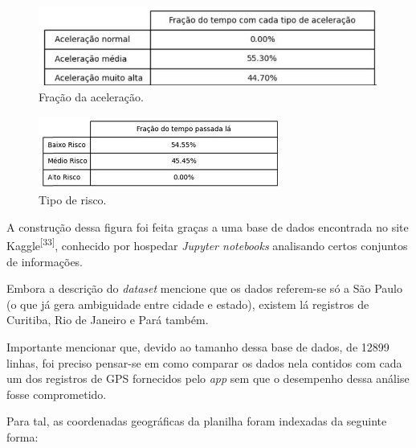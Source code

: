 \begin{figure}[hp]
    \centering
    
    \includegraphics[scale= 0.85]{figures/tabela_2.jpg}
    
    \caption{Fração da aceleração.}
    
    \label{fig:tab1}
\end{figure}

\begin{figure}[hp]
    \centering
    
    \includegraphics[scale= 0.85]{figures/tabela_fracao1.jpg}
    
    \caption{Tipo de risco.}
    
    \label{fig:tab2}
\end{figure}


A construção dessa figura foi feita graças a uma base de dados encontrada no site Kaggle\textsuperscript{[33]}, conhecido por hospedar \textit{Jupyter notebooks} analisando certos conjuntos de informações.

Embora a descrição do \textit{dataset} mencione que os dados referem-se só a São Paulo (o que já gera ambiguidade entre cidade e estado), existem lá registros de Curitiba, Rio de Janeiro e Pará também.

Importante mencionar que, devido ao tamanho dessa base de dados, de 12899 linhas, foi preciso pensar-se em como comparar os dados nela contidos com cada um dos registros de GPS fornecidos pelo \textit{app} sem que o desempenho dessa análise fosse comprometido.

Para tal, as coordenadas geográficas da planilha foram indexadas da seguinte forma: 


